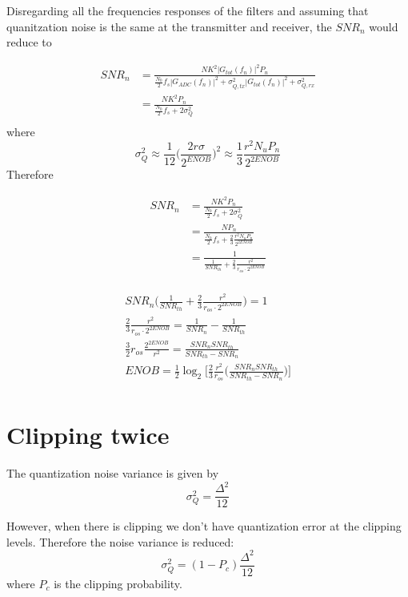 \documentclass[a4paper]{article}
\begin{document}
Disregarding all the frequencies responses of the filters and assuming that quanitzation noise is the same at the transmitter and receiver, the $SNR_n$ would reduce to

\begin{align} \nonumber
SNR_n & =  \frac{NK^2|G_{tot}(f_n)|^2P_n}{\frac{N_0}{2}f_s|G_{ADC}(f_n)|^2 + \sigma_{Q,tx}^2|G_{tot}(f_n)|^2 + \sigma_{Q,rx}^2} \\
& =  \frac{NK^2P_n}{\frac{N_0}{2}f_s + 2\sigma_{Q}^2} \\
\end{align}
where \begin{equation}
\sigma_Q^2 \approx \frac{1}{12}\bigg(\frac{2r\sigma}{2^{ENOB}}\bigg)^2 \approx \frac{1}{3}\frac{r^2N_uP_n}{2^{2ENOB}}
\end{equation}
Therefore

\begin{align} \nonumber
SNR_n & =  \frac{NK^2P_n}{\frac{N_0}{2}f_s + 2\sigma_{Q}^2} \\
& =  \frac{NP_n}{\frac{N_0}{2}f_s + \frac{2}{3}\frac{r^2N_uP_n}{2^{2ENOB}}} \\
& =  \frac{1}{\frac{1}{SNR_{th}} + \frac{2}{3}\frac{r^2}{r_{os}\cdot 2^{2ENOB}}} \\
\end{align}

\begin{align} \nonumber
SNR_n\bigg(\frac{1}{SNR_{th}} + \frac{2}{3}\frac{r^2}{r_{os}\cdot 2^{2ENOB}}\bigg) = 1 \\
\frac{2}{3}\frac{r^2}{r_{os}\cdot 2^{2ENOB}} = \frac{1}{SNR_n} - \frac{1}{SNR_{th}}  \\
\frac{3}{2}r_{os}\frac{2^{2ENOB}}{r^2} = \frac{SNR_nSNR_{th}}{SNR_{th} - SNR_n}  \\
ENOB= \frac{1}{2}\log_2\bigg[\frac{2}{3}\frac{r^2}{r_{os}}\bigg(\frac{SNR_nSNR_{th}}{SNR_{th} - SNR_n}\bigg)\bigg]  \\
\end{align}

\section{Clipping twice}

The quantization noise variance is given by
\begin{equation}
\sigma^2_Q = \frac{\Delta^2}{12}
\end{equation}

However, when there is clipping we don't have quantization error at the clipping levels. Therefore the noise variance is reduced:
\begin{equation}
\sigma^2_Q = (1-P_c)\frac{\Delta^2}{12}
\end{equation}
where $P_c$ is the clipping probability.
\end{document}
